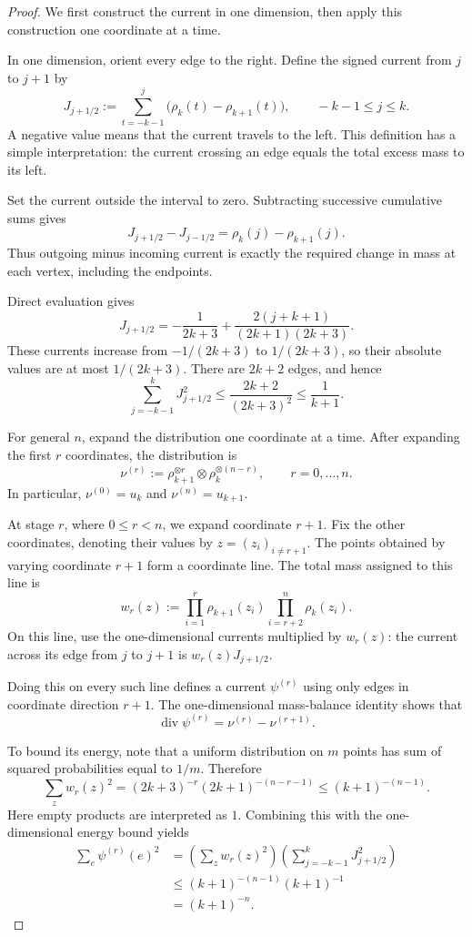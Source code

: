 \documentclass[conference]{IEEEtran}
\begin{document}
\begin{proof}
We first construct the current in one dimension, then apply this
construction one coordinate at a time.

In one dimension, orient every edge to the right. Define the
signed current from $j$ to $j+1$ by
\[
J_{j+1/2}
:=\sum_{t=-k-1}^{j}\bigl(\rho_k(t)-\rho_{k+1}(t)\bigr),
\qquad -k-1\le j\le k.
\]
A negative value means that the current travels to the left.
This definition has a simple interpretation: the current crossing
an edge equals the total excess mass to its left.

Set the current outside the interval to zero. Subtracting
successive cumulative sums gives
\[
J_{j+1/2}-J_{j-1/2}
=\rho_k(j)-\rho_{k+1}(j).
\]
Thus outgoing minus incoming current is exactly the required
change in mass at each vertex, including the endpoints.

Direct evaluation gives
\[
J_{j+1/2}
=-\frac{1}{2k+3}
+\frac{2(j+k+1)}{(2k+1)(2k+3)}.
\]
These currents increase from $-1/(2k+3)$ to $1/(2k+3)$, so
their absolute values are at most $1/(2k+3)$. There are $2k+2$
edges, and hence
\[
\sum_{j=-k-1}^{k}J_{j+1/2}^2
\le \frac{2k+2}{(2k+3)^2}
\le \frac{1}{k+1}.
\]

For general $n$, expand the distribution one coordinate at a time.
After expanding the first $r$ coordinates, the distribution is
\[
\nu^{(r)}
:=\rho_{k+1}^{\otimes r}\otimes
  \rho_k^{\otimes(n-r)},
\qquad r=0,\dots,n.
\]
In particular, $\nu^{(0)}=u_k$ and $\nu^{(n)}=u_{k+1}$.

At stage $r$, where $0\le r<n$, we expand coordinate $r+1$.
Fix the other coordinates, denoting their values by
$z=(z_i)_{i\ne r+1}$. The points obtained by varying coordinate
$r+1$ form a coordinate line. The total mass assigned to this
line is
\[
w_r(z)
:=\prod_{i=1}^{r}\rho_{k+1}(z_i)
  \prod_{i=r+2}^{n}\rho_k(z_i).
\]
On this line, use the one-dimensional currents multiplied by
$w_r(z)$: the current across its edge from $j$ to $j+1$ is
$w_r(z)J_{j+1/2}$.

Doing this on every such line defines a current $\psi^{(r)}$
using only edges in coordinate direction $r+1$. The
one-dimensional mass-balance identity shows that
\[
\operatorname{div}\psi^{(r)}
=\nu^{(r)}-\nu^{(r+1)}.
\]

To bound its energy, note that a uniform distribution on $m$
points has sum of squared probabilities equal to $1/m$.
Therefore
\[
\sum_z w_r(z)^2
=(2k+3)^{-r}(2k+1)^{-(n-r-1)}
\le (k+1)^{-(n-1)}.
\]
Here empty products are interpreted as $1$. Combining this with
the one-dimensional energy bound yields
\[
\begin{aligned}
\sum_e \psi^{(r)}(e)^2
&=\left(\sum_z w_r(z)^2\right)
  \left(\sum_{j=-k-1}^{k}J_{j+1/2}^2\right)\\
&\le (k+1)^{-(n-1)}(k+1)^{-1}\\
&=(k+1)^{-n}.
\end{aligned}
\]


\end{proof}
\end{document}

